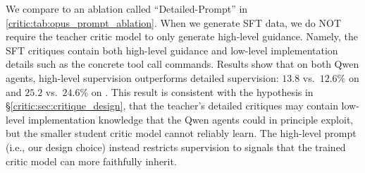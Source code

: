 We compare to an ablation called ``Detailed-Prompt'' in \autoref{critic:tab:opus_prompt_ablation}. When we generate SFT data, we do NOT require the teacher critic model to only generate high-level guidance.
Namely, the SFT critiques contain both high-level guidance and low-level implementation details such as the concrete tool call commands.
Results show that on both Qwen agents, high-level supervision outperforms detailed supervision: $13.8$ vs.\ $12.6\%$ on \criticqwenThirtyTwoB{} and $25.2$ vs.\ $24.6\%$ on \criticqwenNext{}. 
This result is consistent with the hypothesis in §\ref{critic:sec:critique_design}, that the \criticopus{} teacher's detailed critiques may contain low-level implementation knowledge that the Qwen agents could in principle exploit, but the smaller student critic model cannot reliably learn. The high-level prompt (i.e., our design choice) instead restricts supervision to signals that the trained critic model can more faithfully inherit.

\begin{table}[t]
\centering
{}
\caption{Resolve rate (\%) on SWE-Bench Verified for 8B critic models trained on SFT data with the detailed critiques vs.\ the high-level teacher critiques (our data).}
\label{critic:tab:prompt_ablation}
\end{table}


